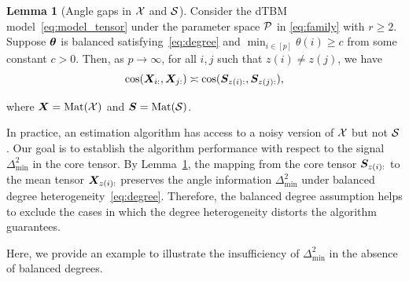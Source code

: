 \documentclass[journal]{IEEEtran}
\theoremstyle{definition}
\newtheorem{lem}{Lemma}
\theoremstyle{definition}
\begin{document}
\begin{lem}[Angle gaps in $\mathcal{X}$ and $\mathcal{S}$]\label{lem:angle_gap_x} Consider the dTBM model~\eqref{eq:model_tensor} under the parameter space $\mathcal{P}$ in \eqref{eq:family} {with $r \geq 2$. Suppose $\boldsymbol{\theta}$ is balanced satisfying~\eqref{eq:degree} {and $\min_{i\in[p]}\theta(i)\geq c$ from some constant $c>0$}.} Then, {as $p \rightarrow \infty$}, for all $i,j$ such that $z(i) \neq z(j)$, we have
\begin{equation}
 \cos(\bm X_{i:}, \bm X_{j:})\asymp  \cos(\bm S_{z(i):}, \bm S_{z(j):}),
\end{equation}

where $\bm X =\text{Mat}(\mathcal{X})$ and $\bm S = \text{Mat} (\mathcal{S})$.
\end{lem}
In practice, an estimation algorithm has access to a noisy version of $\mathcal{X}$ but not $\mathcal{S}$. %
Our goal is to establish the algorithm performance with respect to the signal $\Delta^2_{\min}$ in the core tensor. By Lemma~\ref{lem:angle_gap_x}, the mapping from the core tensor $\bm S_{z(i):}$ to the mean tensor $\bm X_{z(i):}$ preserves the angle information $\Delta_{\min}^2$ under balanced degree heterogeneity~\eqref{eq:degree}. Therefore, the balanced degree assumption helps to exclude the cases in which the degree heterogeneity distorts the algorithm guarantees. 

Here, we provide an example to illustrate the insufficiency of $\Delta_{\min}^2$ in the absence of balanced degrees. 
\end{document}
